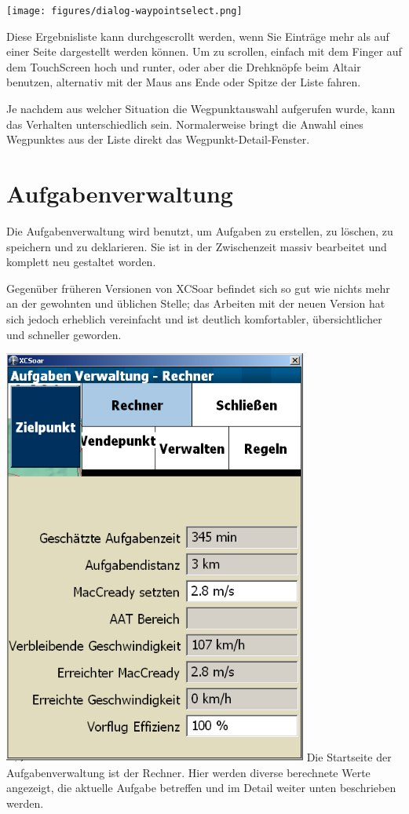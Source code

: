 \begin{center}
\texttt{[image: figures/dialog-waypointselect.png]}
\end{center}

Diese Ergebnisliste kann durchgescrollt werden, wenn Sie Einträge mehr als auf einer Seite dargestellt werden können. Um zu scrollen, einfach mit dem Finger auf dem TouchScreen hoch und runter, oder aber die Drehknöpfe beim Altair benutzen, alternativ mit der Maus ans Ende oder Spitze der Liste fahren.

Je nachdem aus welcher Situation die Wegpunktauswahl aufgerufen wurde, kann das Verhalten unterschiedlich sein. Normalerweise bringt die Anwahl eines Wegpunktes aus der Liste  direkt das Wegpunkt-Detail-Fenster.

\section{Aufgabenverwaltung }\label{sec:task-manager-dialog}
Die Aufgabenverwaltung wird benutzt, um Aufgaben zu erstellen, zu löschen, zu speichern und zu deklarieren. Sie ist in der Zwischenzeit massiv bearbeitet und komplett neu gestaltet worden.

Gegenüber früheren Versionen von \textsf{XCSoar} befindet sich so gut wie nichts mehr an der gewohnten und üblichen Stelle; das Arbeiten mit der neuen Version hat sich jedoch erheblich vereinfacht und ist deutlich komfortabler, übersichtlicher und schneller geworden.

\includegraphics[keepaspectratio,width=0.75\textwidth]{figures/dialog-taskcalculator.png}
Die Startseite der Aufgabenverwaltung ist der Rechner. Hier werden diverse berechnete Werte angezeigt, die aktuelle Aufgabe betreffen und im Detail weiter unten beschrieben werden.

